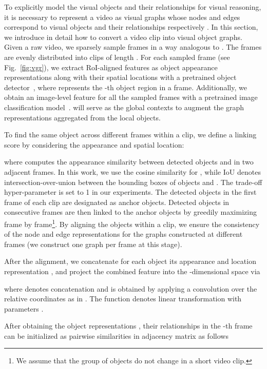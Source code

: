 \documentclass[10pt,journal,compsoc]{IEEEtran}
\begin{document}
To explicitly model the visual objects and their relationships for visual reasoning, it is necessary to represent a video as visual graphs whose nodes and edges correspond to visual objects and their relationships respectively \cite{tsai2019video,xiao2021video}.
In this section, we introduce in detail how to convert a video clip into visual object graphs. Given a raw video, we sparsely sample  frames in a way analogous to \cite{xiao2021video}. The  frames are evenly distributed into  clips of length .
For each sampled frame (see Fig.~\ref{fig:vgr}), we extract  RoI-aligned features as object appearance representations  along with their spatial locations  with a pretrained object detector~\cite{anderson2018bottom,ren2015faster}, where  represents the -th object region in a frame. Additionally, we obtain an image-level feature  for all the sampled frames with a pretrained image classification model~\cite{he2016deep}.  will serve as the global contexts to augment the graph representations aggregated from the local objects. 


To find the same object across different frames within a clip, we define a linking score  by considering the appearance and spatial location:

where  computes the appearance similarity between detected objects  and  in two adjacent frames.  In this work, we use the cosine similarity for , while IoU denotes intersection-over-union between the bounding boxes of objects  and . The trade-off hyper-parameter  is set to 1 in our experiments. The  detected objects in the first frame of each clip are designated as anchor objects. Detected objects in consecutive frames are then linked to the anchor objects by greedily maximizing  frame by frame\footnote{We assume that the group of objects do not change in a short video clip.}. By aligning the objects within a clip, we ensure the consistency of the node and edge representations for the graphs constructed at different frames (we construct one graph per frame at this stage).

After the alignment, we concatenate for each object its appearance  and location representation , and project the combined feature into the -dimensional space via 

where  denotes concatenation and  is obtained by applying a  convolution over the relative coordinates as in \cite{xiao2021video}. The function  denotes linear transformation with parameters . 

After obtaining the object representations , their relationships in the -th frame can be initialized as pairwise similarities in adjacency matrix  as follows
\end{document}
